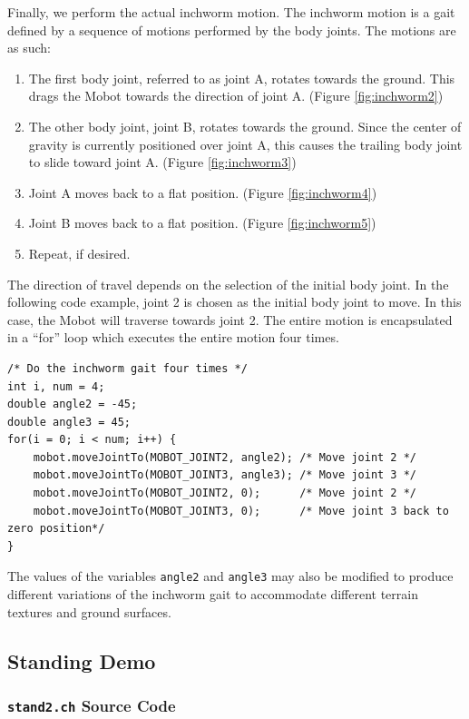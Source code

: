 \documentclass{article}
\begin{document}
Finally, we perform the actual inchworm motion. The inchworm motion is a gait defined
by a sequence of motions performed by the body joints. The motions are as such:
\begin{enumerate}
\item The first body joint, referred to as joint A, rotates towards the ground.
This drags the Mobot towards the direction of joint A. (Figure \ref{fig:inchworm2})
\item The other body joint, joint B, rotates towards the ground. Since the center
of gravity is currently positioned over joint A, this causes the trailing body 
joint to slide toward joint A. (Figure \ref{fig:inchworm3})
\item Joint A moves back to a flat position. (Figure \ref{fig:inchworm4})
\item Joint B moves back to a flat position. (Figure \ref{fig:inchworm5})
\item Repeat, if desired.
\end{enumerate}
The direction of travel depends on the selection of the initial body joint. In
the following code example, joint 2 is chosen as the initial body joint to move.
In this case, the Mobot will traverse towards joint 2. The entire motion is
encapsulated in a ``for'' loop which executes the entire motion four times.
\begin{verbatim}
/* Do the inchworm gait four times */
int i, num = 4;
double angle2 = -45;
double angle3 = 45;
for(i = 0; i < num; i++) {
    mobot.moveJointTo(MOBOT_JOINT2, angle2); /* Move joint 2 */
    mobot.moveJointTo(MOBOT_JOINT3, angle3); /* Move joint 3 */
    mobot.moveJointTo(MOBOT_JOINT2, 0);      /* Move joint 2 */
    mobot.moveJointTo(MOBOT_JOINT3, 0);      /* Move joint 3 back to zero position*/
}
\end{verbatim}
The values of the variables \texttt{angle2} and \texttt{angle3} may also be modified
to produce different variations of the inchworm gait to accommodate different terrain
textures and ground surfaces.

\subsection{Standing Demo}
\subsubsection{\texttt{stand2.ch} Source Code}

\end{document}
